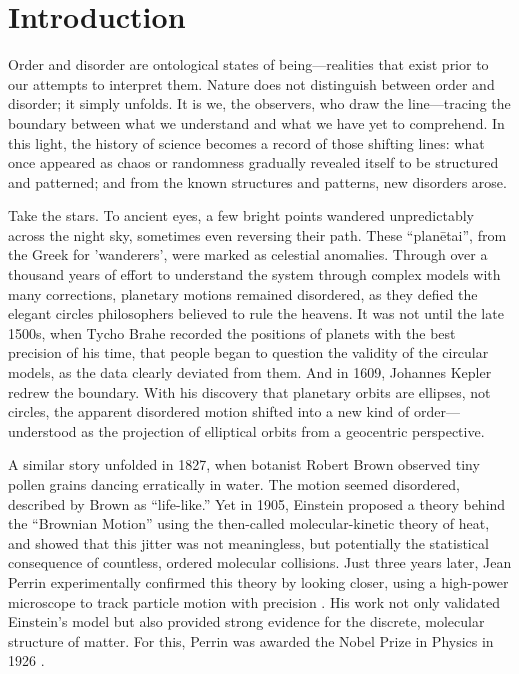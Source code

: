 \chapter{Introduction}
Order and disorder are ontological states of being—realities that exist prior to our attempts to interpret them. Nature does not distinguish between order and disorder; it simply unfolds. It is we, the observers, who draw the line—tracing the boundary between what we understand and what we have yet to comprehend. In this light, the history of science becomes a record of those shifting lines: what once appeared as chaos or randomness gradually revealed itself to be structured and patterned; and from the known structures and patterns, new disorders arose.

Take the stars. To ancient eyes, a few bright points wandered unpredictably across the night sky, sometimes even reversing their path. These “planētai”, from the Greek for 'wanderers', were marked as celestial anomalies. Through over a thousand years of effort to understand the system through complex models with many corrections, planetary motions remained disordered, as they defied the elegant circles philosophers believed to rule the heavens. It was not until the late 1500s, when Tycho Brahe recorded the positions of planets with the best precision of his time, that people began to question the validity of the circular models, as the data clearly deviated from them. And in 1609, Johannes Kepler redrew the boundary. With his discovery that planetary orbits are ellipses, not circles, the apparent disordered motion shifted into a new kind of order—understood as the projection of elliptical orbits from a geocentric perspective.

A similar story unfolded in 1827, when botanist Robert Brown observed tiny pollen grains dancing erratically in water. The motion seemed disordered, described by Brown as “life-like.” Yet in 1905, Einstein proposed a theory behind the “Brownian Motion” using the then-called molecular-kinetic theory of heat\cite{}, and showed that this jitter was not meaningless, but potentially the statistical consequence of countless, ordered molecular collisions. Just three years later, Jean Perrin experimentally confirmed this theory by looking closer, using a high-power microscope to track particle motion with precision \cite{r.BrownianMovementMolecular1911}. His work not only validated Einstein’s model but also provided strong evidence for the discrete, molecular structure of matter. For this, Perrin was awarded the Nobel Prize in Physics in 1926 \cite{ https://www.nobelprize.org/prizes/physics/1926/perrin/lecture/}.

